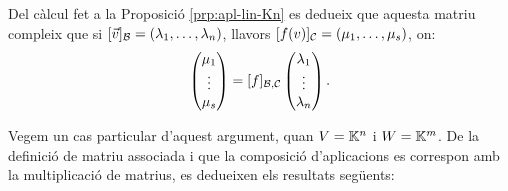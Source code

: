 \documentclass[
  11pt,
]{book}
\numberwithin{dummy}{section}
\theoremstyle{maincolornumbox}
\theoremstyle{blacknumex}
\theoremstyle{blacknumbox}
\theoremstyle{maincolornum}
\newlength\esp
\begin{document}
Del càlcul fet a la Proposició
\ref{prp:apl-lin-Kn} es dedueix que aquesta matriu compleix que
si \([\vec v]_{\mathcal{B}}=(\lambda_1,\dots,\lambda_n)\), llavors
\([f(v)]_{\mathcal{C}}=(\mu_1,\dots,\mu_s)\), on: \begin{align*}
\label{eq:matriu-apl-lineal}
    \begin{pmatrix}
    \mu_1 \\ \vdots \\ \mu_s
    \end{pmatrix}=
    [f]_{\mathcal{B},\mathcal{C}}
    \begin{pmatrix}
    \lambda_1 \\ \vdots \\ \lambda_n
    \end{pmatrix}.
\end{align*}

Vegem un cas particular d'aquest argument, quan \(V=\mathbb{K}^n\) i \(W=\mathbb{K}^m\). De
la definició de matriu associada i que la composició d'aplicacions es
correspon amb la multiplicació de matrius, es dedueixen els resultats
següents:
\end{document}
